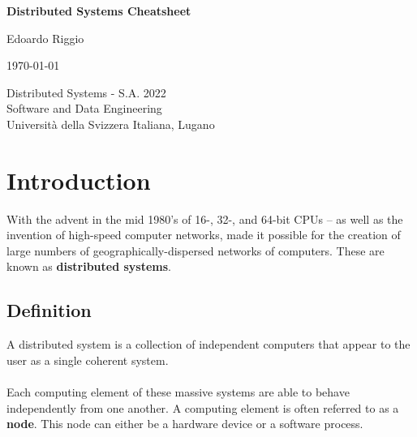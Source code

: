 \documentclass{article}
\begin{document}
\begin{titlepage}
    \begin{center}
        \vspace*{1cm}
        
        \Huge
        \textbf{Distributed Systems Cheatsheet}
        
        \vspace{0.5cm}
        \LARGE
        
        \vspace{.5cm}
        
        Edoardo Riggio
   		  \vspace{1.5cm}
       
        \vfill
        
        \today
        
        \vspace{.8cm}
          \Large
          Distributed Systems - S.A. 2022 \\
        Software and Data Engineering \\
        Universit\`{a} della Svizzera Italiana, Lugano \\
        
    \end{center}
\end{titlepage}

\tableofcontents

\newpage

\section{Introduction}
With the advent in the mid 1980's of 16-, 32-, and 64-bit CPUs -- as well as the invention of high-speed computer networks, made it possible for the creation of large numbers of geographically-dispersed networks of computers. These are known as \textbf{distributed systems}.

\subsection{Definition}
A distributed system is a collection of independent computers that appear to the user as a single coherent system. \\ \\
Each computing element of these massive systems are able to behave independently from one another. A computing element is often referred to as a \textbf{node}. This node can either be a hardware device or a software process.
\end{document}
